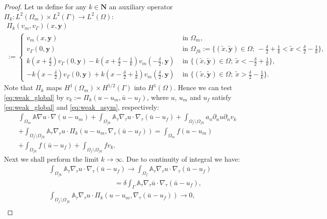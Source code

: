 \documentclass[a4paper]{article}
\def\vc#1{\mathbf{\boldsymbol{#1}}}     %
\def\tn#1{{\mathbb{#1}}}    %
\def\Natural{\mathbf N}
\begin{document}
\begin{proof}
Let us define for any $k\in\Natural$ an auxiliary operator $\Pi_k:L^2(\Omega_m)\times L^2(\Gamma)\to L^2(\Omega)$:
\begin{multline*}
\Pi_k(v_m,v_\Gamma)(x,\vc y)\\ :=
\begin{cases}
v_m(x,\vc y) & \mbox{ in }\Omega_m,\\
v_\Gamma(0,\vc y) & \mbox{ in }\Omega_{fk}:=\{(\tilde x,\tilde{\vc y})\in\Omega;~-\frac\delta2+\frac1k<\tilde x<\frac\delta2-\frac1k\},\\
k(x+\frac\delta2)v_\Gamma(0,\vc y) - k(x+\frac\delta2-\frac1k)v_m(-\frac\delta2,\vc y) & \mbox{ in }\{(\tilde x,\tilde{\vc y})\in\Omega;~\tilde x<-\frac\delta2+\frac1k\},\\
-k(x-\frac\delta2)v_\Gamma(0,\vc y) + k(x-\frac\delta2+\frac1k)v_m(\frac\delta2,\vc y) & \mbox{ in }\{(\tilde x,\tilde{\vc y})\in\Omega;~\tilde x>\frac\delta2-\frac1k\}.
\end{cases}
\end{multline*}
Note that $\Pi_k$ maps $H^1(\Omega_m)\times H^{1/2}(\Gamma)$ into $H^1(\Omega)$.
Hence we can test \eqref{eq:weak_global} by $v_k:=\Pi_k(u-u_m,\bar u-u_f)$, where $u$, $u_m$ and $u_f$ satisfy \eqref{eq:weak_global} and \eqref{eq:weak_asym}, respectively:
\begin{multline}
\label{eq:global_vk}
\int_{\Omega_m}\tn A\nabla u\cdot\nabla(u-u_m)
+\int_{\Omega_{fk}}\tn A_\tau\nabla_\tau u\cdot\nabla_\tau(\bar u-u_f)
+\int_{\Omega_f\setminus\Omega_{fk}} a_n\partial_n u \partial_n v_k\\
+ \int_{\Omega_f\setminus\Omega_{fk}} \tn A_\tau\nabla_\tau u \cdot \Pi_k(u-u_m,\nabla_\tau(\bar u-u_f))
= \int_{\Omega_m} f (u-u_m)\\
+ \int_{\Omega_{fk}} f (\bar u-u_f)
+ \int_{\Omega_f\setminus\Omega_{fk}} f v_k.
\end{multline}
Next we shall perform the limit $k\to\infty$.
Due to continuity of integral we have:
\begin{align}
&\int_{\Omega_{fk}}\tn A_\tau\nabla_\tau u\cdot\nabla_\tau(\bar u-u_f) \to \int_{\Omega_f}\tn A_\tau\nabla_\tau u\cdot\nabla_\tau(\bar u-u_f)\\
&\hspace{4cm} = \delta\int_\Gamma\tn A_\tau\nabla_\tau\bar u\cdot\nabla_\tau(\bar u-u_f),\\
&\int_{\Omega_f\setminus\Omega_{fk}} \tn A_\tau\nabla_\tau u \cdot \Pi_k(u-u_m,\nabla_\tau(\bar u-u_f)) \to 0, \\

\end{align}
\end{proof}
\end{document}
